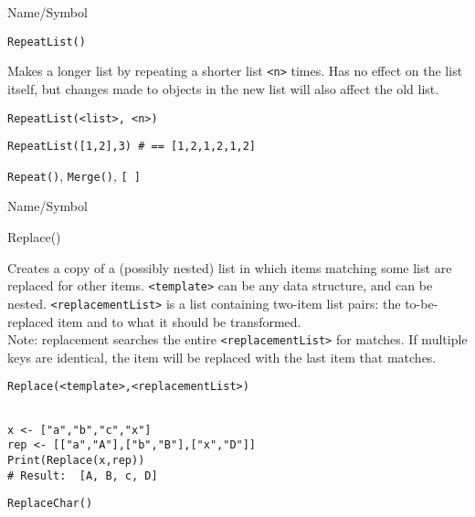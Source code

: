 \begin{desc}{Name/Symbol}
\item[Name/Symbol] 	\verb+RepeatList()+

\item[Description]  	Makes a longer list by repeating a shorter list \verb+<n>+ times. 
	Has no effect on the list itself, but changes made to objects 
	in the new list will also affect the old list.

\item[Usage]       	
\begin{verbatim}
RepeatList(<list>, <n>)
\end{verbatim}

\item[Example]     	
\begin{verbatim}
RepeatList([1,2],3) # == [1,2,1,2,1,2]
\end{verbatim}

\item[See Also]    	\verb+Repeat()+, \verb+Merge()+, \verb+[ ]+
\end{desc}

\rl



\begin{desc}{Name/Symbol}
\item[Name/Symbol]  	Replace()

\item[Description]  	Creates a copy of a (possibly nested) list in which
		items matching some list are replaced for other items.  
		\verb+<template>+ can be any data structure, and can be nested.  
		\verb+<replacementList>+ is a list containing two-item list pairs:
		the to-be-replaced item and to what it should be transformed.\\
		Note: replacement searches the entire \verb+<replacementList>+ for 
		matches.  If multiple keys are identical, the item will be 
		replaced with the last item that matches.

\item[Usage]        	
\begin{verbatim}
Replace(<template>,<replacementList>)
\end{verbatim}
			  
\item[Example]     	
\begin{verbatim}

x <- ["a","b","c","x"]
rep <- [["a","A"],["b","B"],["x","D"]]
Print(Replace(x,rep))
# Result:  [A, B, c, D] 
\end{verbatim}

\item[See Also]	
\verb+ReplaceChar()+
\end{desc}

